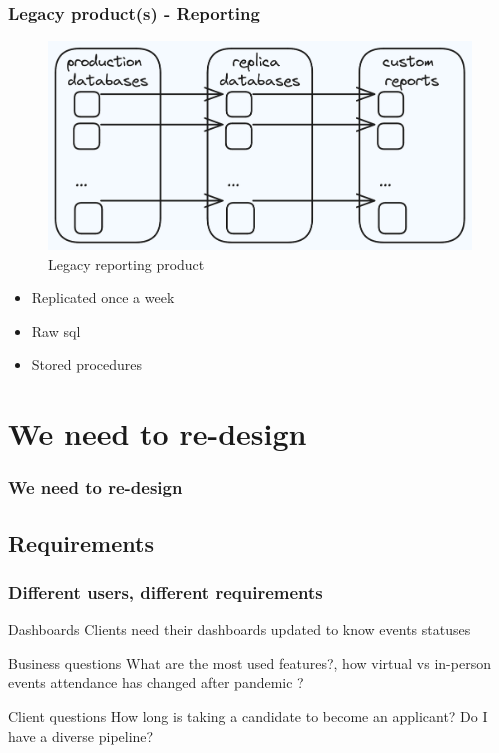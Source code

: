 \documentclass{beamer}
\begin{document}
\begin{frame}
\frametitle{Legacy product(s) - Reporting}
    \begin{figure}
        \centering
        \includegraphics[width=1\textwidth]{pictures/legacy_reporting}
        \caption{Legacy reporting product}
    \end{figure}
    \begin{itemize}
        \item Replicated once a week 
        \item Raw sql
        \item Stored procedures
    \end{itemize}
\end{frame}

\section{We need to re-design}
\begin{frame}
\frametitle{We need to re-design}
\end{frame}

\subsection{Requirements}
\begin{frame}
    \frametitle{Different users, different requirements}

    \begin{block}{Dashboards}
        Clients need their dashboards updated to know events statuses
    \end{block}

    \begin{alertblock}{Business questions}
        What are the most used features?, how virtual vs in-person events attendance has changed after pandemic ?
    \end{alertblock}

    \begin{exampleblock}{Client questions}
        How long is taking a candidate to become an applicant? Do I have a diverse pipeline?
    \end{exampleblock}
\end{frame}
\end{document}
